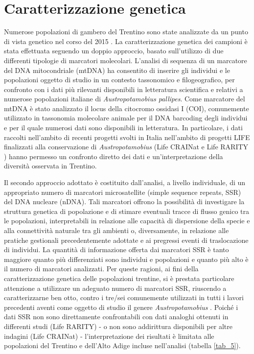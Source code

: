 \documentclass[11pt,a4paper,italian,twoside,openany]{memoir}
\begin{document}
\section{Caratterizzazione genetica}
\label{sec_gene}
Numerose popolazioni di gambero del Trentino sono state analizzate da un punto di vista genetico nel corso del 2015 \cite{Gandolfi 2015}. La caratterizzazione genetica dei campioni è stata effettuata seguendo un doppio approccio, basato sull'utilizzo di due differenti tipologie di marcatori molecolari. L'analisi di sequenza di un marcatore del DNA mitocondriale (mtDNA) ha consentito di inserire gli individui e le popolazioni oggetto di studio in un contesto tassonomico e filogeografico, per confronto con i dati più rilevanti disponibili in letteratura scientifica e relativi a numerose popolazioni italiane di \emph{Austropotamobius pallipes}. Come marcatore del mtDNA è stato analizzato il locus della citocromo ossidasi I (COI), comunemente utilizzato in tassonomia molecolare animale per il DNA barcoding degli individui e per il quale numerosi dati sono disponibili in letteratura. In particolare, i dati raccolti nell'ambito di recenti progetti svolti in Italia nell'ambito di progetti LIFE finalizzati alla conservazione di \emph{Austropotamobius} (Life CRAINat \cite{CRAINAT} e Life RARITY \cite{RARITY} ) hanno permesso un confronto diretto dei dati e un'interpretazione della diversità osservata in Trentino.

Il secondo approccio adottato è costituito dall'analisi, a livello individuale, di un appropriato numero di marcatori microsatellite (simple sequence repeats, SSR) del DNA nucleare (nDNA). Tali marcatori offrono la possibilità di investigare la struttura genetica di popolazione e di stimare eventuali tracce di flusso genico tra le popolazioni, interpretabili in relazione alle capacità di dispersione della specie e alla connettività naturale tra gli ambienti o, diversamente, in relazione alle pratiche gestionali precedentemente adottate e ai pregressi eventi di traslocazione di individui. La quantità di informazione offerta dai marcatori SSR è tanto maggiore quanto più differenziati sono individui e popolazioni e quanto più alto è il numero di marcatori analizzati. Per queste ragioni, ai fini della caratterizzazione genetica delle popolazioni trentine, si è prestata particolare attenzione a utilizzare un adeguato numero di marcatori SSR, riuscendo a caratterizzarne ben otto, contro i tre/sei comunemente utilizzati in tutti i lavori precedenti aventi come oggetto di studio il genere \emph{Austropotamobius} \cite{Baric 2005} \cite{Bertocchi 2008} \cite{Matallanas 2013}. Poiché i dati SSR non sono direttamente confrontabili con dati analoghi ottenuti in differenti studi (Life RARITY) - o non sono addirittura disponibili per altre indagini (Life CRAINat) - l'interpretazione dei risultati è limitata alle popolazioni del Trentino e dell'Alto Adige incluse nell'analisi (tabella \ref{tab_5}).
\end{document}
